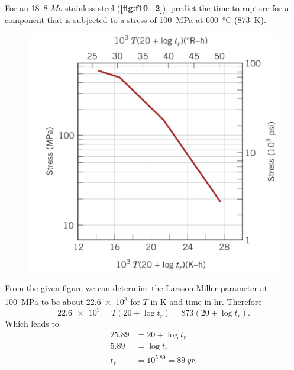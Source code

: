  For an 18--8 $Mo$ stainless steel (\textbf{\autoref{fig:f10_2}}), predict the time to rupture for a component that is subjected to a stress of \qty{100}{MPa} at \qty{600}{\celsius} (\qty{873}{K}).
\begin{figure} [ht]
  \centering
  \caption{}
  \includegraphics[width=0.5\linewidth]{./figures/f10_2.png}
  \label{fig:f10_2}
\end{figure}
\bigbreak
From the given figure we can determine the Larsson-Miller parameter at \qty{100}{MPa} to be about \num{22,6e3} for $T$ in \unit{K} and time in \unit{hr}. Therefore
\[ 
\num{22,6e3} = T \left( 20 + \log t_r \right) = 873(20 + \log t_r)
.\]
Which leads to
\begin{align*}
  \num{25,89} &= 20 + \log t_r \\
  \num{5,89}  &= \log t_r \\
  t_r &= 10^{\num{5,89}} = \qty{89}{yr} 
.\end{align*}
